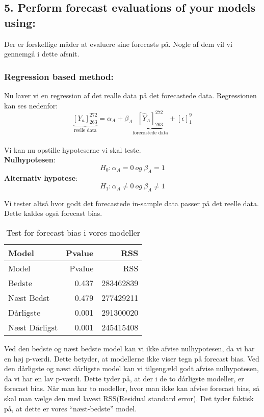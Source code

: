 \documentclass[
  10pt,
]{article}
\begin{document}
\hypertarget{perform-forecast-evaluations-of-your-models-using}{%
\subsection{5. Perform forecast evaluations of your models
using:}\label{perform-forecast-evaluations-of-your-models-using}}

Der er forskellige måder at evaluere sine forecasts på. Nogle af dem vil
vi gennemgå i dette afsnit.

\hypertarget{regression-based-method}{%
\subsubsection{Regression based method:}\label{regression-based-method}}

Nu laver vi en regression af det realle data på det forecastede data.
Regressionen kan ses nedenfor:
\[\underbrace{{{[Y_a]}}_{263}^{272}}_\text{reelle data} = \alpha_A + \beta_A \underbrace{ [\hat{Y}_A]_{263}^{272}}_\text{forecastede data} + [\epsilon]_{1}^{9}  \]\\
Vi kan nu opstille hypoteserne vi skal teste.\\
\textbf{Nulhypotesen}:
\[H_0: \alpha_A = 0 \ og\ \beta_A = 1 \tag{Ikke Forecast bias} \]
\textbf{Alternativ hypotese}:
\[H_1: \alpha_A \neq 0 \ og \ \beta_A \neq 1 \tag{Forecast bias} \]

Vi tester altså hvor godt det forecastede in-sample data passer på det
reelle data. Dette kaldes også forecast bias.

\begin{longtable}[]{@{}lrr@{}}
\caption{Test for forecast bias i vores modeller}\tabularnewline
\toprule
Model & Pvalue & RSS\tabularnewline
\midrule
\endfirsthead
\toprule
Model & Pvalue & RSS\tabularnewline
\midrule
\endhead
Bedste & 0.437 & 283462839\tabularnewline
Næst Bedst & 0.479 & 277429211\tabularnewline
Dårligste & 0.001 & 291300020\tabularnewline
Næst Dårligst & 0.001 & 245415408\tabularnewline
\bottomrule
\end{longtable}

Ved den bedste og næst bedste model kan vi ikke afvise nulhypotesen, da
vi har en høj p-værdi. Dette betyder, at modellerne ikke viser tegn på
forecast bias. Ved den dårligste og næst dårligste model kan vi
tilgengæld godt afvise nulhypotesen, da vi har en lav p-værdi. Dette
tyder på, at der i de to dårligste modeller, er forecast bias. Når man
har to modeller, hvor man ikke kan afvise forecast bias, så skal man
vælge den med lavest RSS(Residual standard error). Det tyder faktisk på,
at dette er vores ``næst-bedste'' model.
\end{document}
